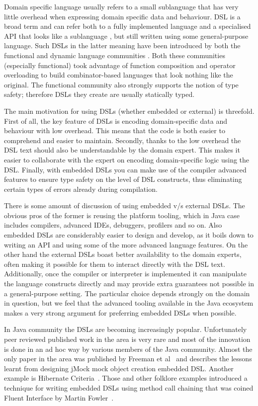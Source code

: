 \documentclass{sig-alternate}
\begin{document}
Domain specific language usually refers to a small sublanguage that has very little overhead when expressing domain specific data and behaviour. DSL is a broad term \cite{vandeursen2000dsl,bentley1999pp} and can refer both to a fully implemented language and a specialised API that looks like a sublanguage \cite{hudak1996}, but still written using some general-purpose language. Such DSLs in the latter meaning have been introduced by both the functional \cite{bringert2004sph} and dynamic language communities \cite{cuadrado2007bds}. Both these communities (especially functional) took advantage of function composition and operator overloading to build combinator-based languages that look nothing like the original. The functional community also strongly supports the notion of type safety; therefore DSLs they create are usually statically typed.

The main motivation for using DSLs (whether embedded or external) is threefold. First of all, the key feature of DSLs is encoding domain-specific data and behaviour with low overhead. This means that the code is both easier to comprehend and easier to maintain. Secondly, thanks to the low overhead the DSL text should also be understandable by the domain expert. This makes it easier  to collaborate with the expert on encoding domain-specific logic using the DSL. Finally, with embedded DSLs you can make use of the compiler advanced features to ensure type safety on the level of DSL constructs, thus eliminating certain types of errors already during compilation.

There is some amount of discussion of using embedded v/s external DSLs. The obvious pros of the former is reusing the platform tooling, which in Java case includes compilers, advanced IDEs, debuggers, profilers and so on. Also embedded DSLs are considerably easier to design and develop, as it boils down to writing an API and using some of the more advanced language features. On the other hand the external DSLs boast better availability to the domain experts, often making it possible for them to interact directly with the DSL text. Additionally, once the compiler or interpreter is implemented it can manipulate the language constructs directly and may provide extra guarantees not possible in a general-purpose setting. The particular choice depends strongly on the domain in question, but we feel that the advanced tooling available in the Java ecosystem makes a very strong argument for preferring embedded DSLs when possible.

In Java community the DSLs are becoming increasingly popular. Unfortunately peer reviewed published work in the area is very rare and most of the innovation is done in an ad hoc way by various members of the Java community. Almost the only paper in the area was published by Freeman et al~\cite{freeman2004jsr} and describes the lessons learnt from designing jMock mock object creation embedded DSL. Another example is Hibernate Criteria~\cite{bauer2005ha}. Those and other folklore examples introduced a technique for writing embedded DSLs using method call chaining that was coined Fluent Interface by Martin Fowler~\cite{fowler2005}.
\end{document}
